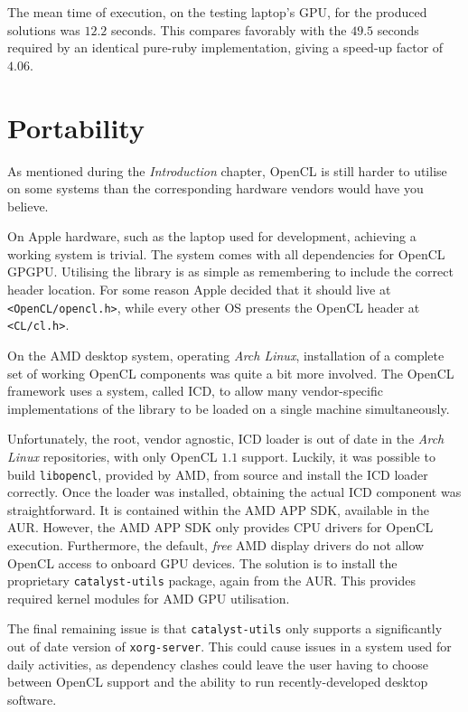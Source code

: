 The mean time of execution, on the testing laptop's \ac{GPU}, for the produced solutions was $12.2$ seconds.
This compares favorably with the $49.5$ seconds required by an identical pure-ruby implementation, giving a speed-up factor of $4.06$.

\section{Portability}
As mentioned during the \emph{Introduction} chapter, \ac{OpenCL} is still harder to utilise on some systems than the corresponding hardware vendors would have you believe.

On Apple hardware, such as the laptop used for development, achieving a working system is trivial.
The system comes with all dependencies for \ac{OpenCL} \ac{GPGPU}. Utilising the library is as simple as remembering to include the correct header location. For some reason Apple decided that it should live at \verb|<OpenCL/opencl.h>|, while every other \ac{OS} presents the \ac{OpenCL} header at \verb|<CL/cl.h>|.

On the \ac{AMD} desktop system, operating \emph{Arch Linux}, installation of a complete set of working \ac{OpenCL} components was quite a bit more involved.
The \ac{OpenCL} framework uses a system, called \ac{ICD}, to allow many vendor-specific implementations of the library to be loaded on a single machine simultaneously.

Unfortunately, the root, vendor agnostic, \ac{ICD} loader is out of date in the \emph{Arch Linux} repositories, with only \ac{OpenCL} $1.1$ support. Luckily, it was possible to build \verb|libopencl|, provided by \ac{AMD}, from source and install the \ac{ICD} loader correctly.
Once the loader was installed, obtaining the actual \ac{ICD} component was straightforward. It is contained within the \ac{AMD} APP SDK, available in the \ac{AUR}.
However, the AMD APP SDK only provides \ac{CPU} drivers for \ac{OpenCL} execution. Furthermore, the default, \emph{free} \ac{AMD} display drivers do not allow \ac{OpenCL} access to onboard \ac{GPU} devices. The solution is to install the proprietary \verb|catalyst-utils| package, again from the \ac{AUR}. This provides required kernel modules for \ac{AMD} \ac{GPU} utilisation.

The final remaining issue is that \verb|catalyst-utils| only supports a significantly out of date version of \verb|xorg-server|. This could cause issues in a system used for daily activities, as dependency clashes could leave the user having to choose between \ac{OpenCL} support and the ability to run recently-developed desktop software.
